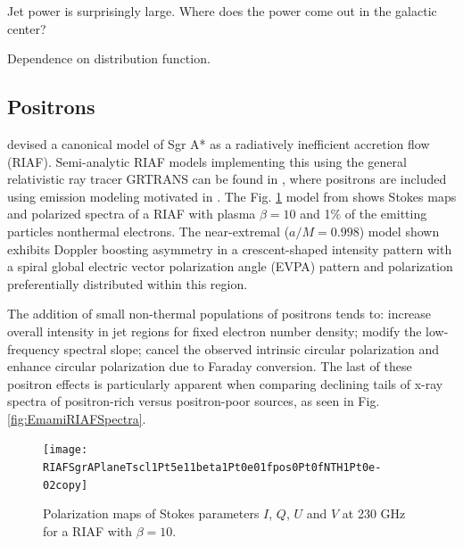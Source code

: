 Jet power is surprisingly large.  Where does the power come out in the galactic center?

Dependence on distribution function.



\subsection{Positrons}


\cite{Broderick2005} devised a canonical model of Sgr A* as a  radiatively inefficient accretion flow (RIAF). Semi-analytic RIAF models implementing  this using the general relativistic ray tracer GRTRANS \citep{2016MNRAS.462..115D} can be found in  \cite{Emami2021}, where  positrons are included using emission modeling motivated in  \cite{Anantua:2019bna}. The Fig. \ref{fig:EmamiRIAF} model from \cite{Emami2021}  shows Stokes maps and polarized spectra of a \cite{Broderick2005} RIAF with plasma $\beta=10$ and 1$\%$ of the emitting particles nonthermal electrons. The near-extremal ($a/M=0.998$) model shown exhibits Doppler boosting asymmetry in a crescent-shaped intensity pattern with a spiral global electric vector polarization angle (EVPA) pattern and polarization preferentially distributed within this region.

The addition of small non-thermal populations of positrons \citep{Anantua:2019bna,Emami2021} tends to: increase overall intensity in jet regions for fixed electron number density; modify the low-frequency spectral slope; cancel the observed intrinsic circular polarization and enhance circular polarization due to Faraday conversion. The last of these positron effects is particularly apparent when comparing declining tails of x-ray spectra of positron-rich versus positron-poor sources, as seen in Fig. \ref{fig:EmamiRIAFSpectra}.

\begin{figure}%
\texttt{[image: RIAFSgrAPlaneTscl1Pt5e11beta1Pt0e01fpos0Pt0fNTH1Pt0e-02copy]}
  \caption{Polarization maps of Stokes parameters $I$, $Q$, $U$ and $V$ at 230 GHz for a \cite{Broderick2005} RIAF with $\beta=10$.}
  \label{fig:EmamiRIAF}
\end{figure}


